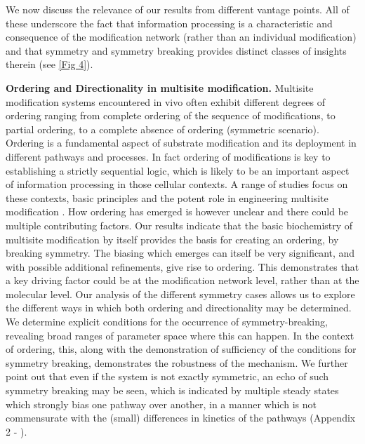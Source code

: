 \documentclass[9pt,lineno]{elife}
\begin{document}
We now discuss the relevance of our results from different vantage points. All of these underscore the fact that information processing is a characteristic and consequence of the modification network (rather than an individual modification) and that symmetry and symmetry breaking provides distinct classes of insights therein (see \cref{Fig 4}).
    
{\bf Ordering and Directionality in multisite modification.} Multisite modification systems encountered in vivo often exhibit different degrees of ordering ranging from complete ordering of the sequence of modifications, to partial ordering, to a complete absence of ordering (symmetric scenario). Ordering is a fundamental aspect of substrate modification and its deployment in different pathways and processes. In fact ordering of modifications is key to establishing a strictly sequential logic, which is likely to be an important aspect of information processing in those cellular contexts.
A range of studies focus on these contexts, basic principles and the potent role in engineering multisite modification \cite{Kocieniewski2012, Lyons2013, Ramachandran1992,Lossl2016, Valk2014,Koivomagi2013}.
How ordering has emerged is however unclear and there could be multiple contributing factors. Our results indicate that the basic biochemistry of multisite modification by itself provides the basis for creating an ordering, by breaking symmetry. 
The biasing which emerges can itself be very significant, and with possible additional refinements, give rise to ordering.
This demonstrates that a key driving factor could be at the modification network level, rather than at the molecular level. Our analysis of the different symmetry cases allows us to  explore the different ways in which both ordering and directionality may be determined. We determine explicit conditions for the occurrence of symmetry-breaking, revealing
broad ranges of parameter space where this can happen. In the context of ordering, this, along with the demonstration of sufficiency of the conditions for symmetry breaking, demonstrates the robustness of the mechanism. We further point out that even if the system is not exactly symmetric, an echo of such symmetry breaking may be seen, which is indicated by multiple steady states which strongly bias one pathway over another, in a manner which is not commensurate with the (small) differences in kinetics of the pathways (Appendix 2 - ).
\end{document}
